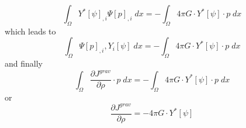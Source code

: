\begin{equation}\label{ref:GRAV:EQU:20e}
\int_{\Omega} Y^*[\psi]_{,i}  \Psi[p]_{,i} \; dx  = - \int_{\Omega}  4\pi G \cdot Y^*[\psi] \cdot  p\;  dx  
\end{equation}
which leads to 
\begin{equation}\label{ref:GRAV:EQU:20ee}
\int_{\Omega} \Psi[p]_{,i} ,Y_i[\psi]  \; dx  = - \int_{\Omega}  4\pi G \cdot Y^*[\psi] \cdot  p \; dx  
\end{equation}
and finally
\begin{equation}\label{ref:GRAV:EQU:201a}
\int_{\Omega}   \frac{\partial J^{grav}}{\partial \rho} \cdot p \;  dx  = - \int_{\Omega}  
4\pi G \cdot Y^*[\psi] \cdot  p \; dx  
\end{equation} 
or 
\begin{equation}\label{ref:GRAV:EQU:201b}
\frac{\partial J^{grav}}{\partial \rho}  =- 4\pi G \cdot Y^*[\psi]
\end{equation} 

